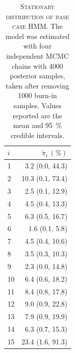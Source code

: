 \clearpage
\begin{table}[h!]
 \centering
 \caption[Stationary distribution of base case HMM]{\textsc{Stationary distribution of base case HMM}. The model was estimated with four independent MCMC chains with \num{4000} posterior samples, taken after removing \num{1000} burn-in samples. Values reported are the mean and \SI{95}{\percent} credible intervals.}
 \label{tab:base_case_stat_dist}
 \begin{tabular}{lr}
 \toprule
 $i$ & $\widetilde{\pi}_{i}\ (\si{\percent})$ \\
 \midrule
 1 & 3.2 (0.0, 44.3) \\
 2 & 10.3 (0.1, 73.4) \\
 3 & 2.5 (0.1, 12.9) \\
 4 & 4.5 (0.4, 13.3) \\
 5 & 6.3 (0.5, 16.7) \\
 6 & 1.6 (0.1, 5.8) \\
 7 & 4.5 (0.4, 10.6) \\
 8 & 3.5 (0.3, 10.3) \\
 9 & 2.3 (0.0, 14.8) \\
 10 & 6.4 (0.6, 18.2) \\
 11 & 8.4 (0.8, 17.8) \\
 12 & 9.0 (0.9, 22.8) \\
 13 & 7.9 (0.9, 19.9) \\
 14 & 6.3 (0.7, 15.3) \\
 15 & 23.4 (1.6, 91.3) \\
 \bottomrule
 \end{tabular}
\end{table}


